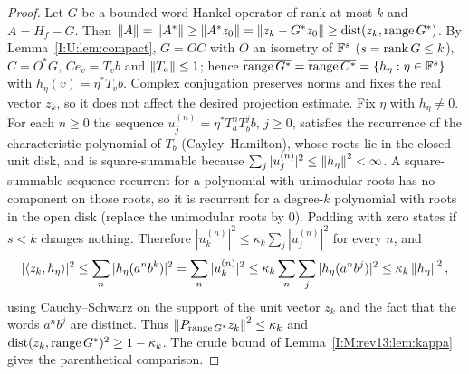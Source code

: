 \begin{proof}
Let $G$ be a bounded word-Hankel operator of rank at most $k$ and $A=H_f-G$. Then
$\left\lVert A\right\rVert=\left\lVert A^*\right\rVert\ge\left\lVert A^*z_0\right\rVert=\left\lVert z_k-G^*z_0\right\rVert\ge\operatorname{dist}(z_k,\operatorname{range} G^*)$.
By Lemma~\ref{I:U:lem:compact}, $G=OC$ with $O$ an
isometry of $\mathbb F^s$ ($s=\operatorname{rank} G\le k$), $C=O^*G$, $Ce_v=T_vb$ and $\left\lVert T_a\right\rVert\le1$; hence
$\overline{\operatorname{range} G^*}=\overline{\operatorname{range} C^*}=\{h_\eta:\eta\in\mathbb F^s\}$ with $h_\eta(v)=\eta^*T_vb$. Complex conjugation preserves norms and fixes the real vector $z_k$,
so it does not affect the desired projection estimate. Fix $\eta$ with
$h_\eta\ne0$. For each $n\ge0$ the sequence $u^{(n)}_j=\eta^*T_a^nT_b^jb$, $j\ge0$,
satisfies the recurrence of the characteristic polynomial of $T_b$ (Cayley--Hamilton),
whose roots lie in the closed unit disk, and is square-summable because
$\sum_j|u^{(n)}_j|^2\le\left\lVert h_\eta\right\rVert^2<\infty$. A square-summable sequence recurrent for a
polynomial with unimodular roots has no component on those roots, so it is recurrent for a
degree-$k$ polynomial with roots in the open disk (replace the unimodular roots by $0$).
Padding with zero states if $s<k$ changes nothing. Therefore
$|u^{(n)}_k|^2\le\kappa_k\sum_j|u^{(n)}_j|^2$ for every $n$, and
\[
|\langle z_k,h_\eta\rangle|^2\le\sum_n|h_\eta(a^nb^k)|^2
=\sum_n|u^{(n)}_k|^2\le\kappa_k\sum_n\sum_j|h_\eta(a^nb^j)|^2\le\kappa_k\left\lVert h_\eta\right\rVert^2,
\]
using Cauchy--Schwarz on the support of the unit vector $z_k$ and the fact that the words
$a^nb^j$ are distinct. Thus $\left\lVert P_{\operatorname{range} G^*}z_k\right\rVert^2\le\kappa_k$ and
$\operatorname{dist}(z_k,\operatorname{range} G^*)^2\ge1-\kappa_k$. The crude bound of Lemma~\ref{I:M:rev13:lem:kappa} gives the
parenthetical comparison.
\end{proof}
